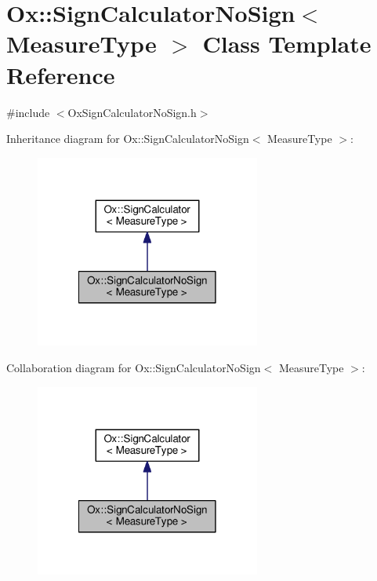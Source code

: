 \hypertarget{class_ox_1_1_sign_calculator_no_sign}{\section{Ox\-:\-:Sign\-Calculator\-No\-Sign$<$ Measure\-Type $>$ Class Template Reference}
\label{class_ox_1_1_sign_calculator_no_sign}
}


{\ttfamily \#include $<$Ox\-Sign\-Calculator\-No\-Sign.\-h$>$}



Inheritance diagram for Ox\-:\-:Sign\-Calculator\-No\-Sign$<$ Measure\-Type $>$\-:
\nopagebreak
\begin{figure}[H]
\begin{center}
\leavevmode
\includegraphics[width=210pt]{class_ox_1_1_sign_calculator_no_sign__inherit__graph}
\end{center}
\end{figure}


Collaboration diagram for Ox\-:\-:Sign\-Calculator\-No\-Sign$<$ Measure\-Type $>$\-:
\nopagebreak
\begin{figure}[H]
\begin{center}
\leavevmode
\includegraphics[width=210pt]{class_ox_1_1_sign_calculator_no_sign__coll__graph}
\end{center}
\end{figure}
